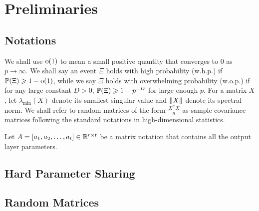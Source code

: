 \section{Preliminaries}



\subsection{Notations}
We shall use $\oo(1)$ to mean a small positive quantity that converges to 0 as $p\to \infty$. 
We shall say an event $\Xi$ holds with high probability (w.h.p.) if $\P(\Xi)\ge 1- \oo(1)$, while we say $\Xi$ holds with overwhelming probability (w.o.p.) if for any large constant $D>0$, $\P(\Xi)\ge 1- p^{-D}$ for large enough $p$. For a matrix $X$, let $\lambda_{\min}(X)$ denote its smallest singular value and $\norm{X}$ denote its spectral norm.
We shall refer to random matrices of the form $\frac {X^\top X} n$ as sample covariance matrices following the standard notations in high-dimensional statistics.


Let $A = [a_1, a_2, \dots, a_t] \in \real^{r\times t}$ be a matrix notation that contains all the output layer parameters.


\subsection{Hard Parameter Sharing}


\subsection{Random Matrices}

